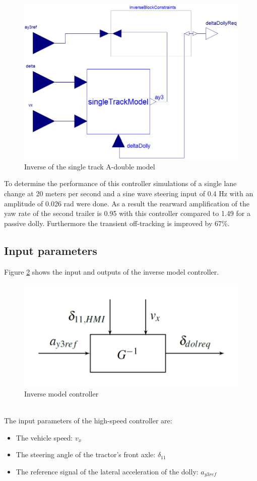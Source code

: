 \documentclass[ExampleMasters.tex]{subfiles}
\begin{document}
\begin{figure}[!htb]
	\centering
	\includegraphics[width=0.5\linewidth]{figures/Inverse_of_A-double_single-track}
	\caption{Inverse of the single track A-double model \cite{High-speed_paper}}
	
	\label{fig:inverse_single_track_model}
\end{figure}

To determine the performance of this controller simulations of a single lane change at 20 meters per second and a sine wave steering input of 0.4 Hz with an amplitude of 0.026 rad were done. As a result the rearward amplification of the yaw rate of the second trailer is 0.95 with this controller compared to 1.49 for a passive dolly. Furthermore the transient off-tracking is improved by 67\%. 

\subsection{Input parameters}
\label{sec:input_parameters_HS}
Figure \ref{fig:inverse_model_controller} shows the input and outputs of the inverse model controller.
\begin{figure}[!htb]
	\centering
	\includegraphics[width=0.5\linewidth]{figures/inverse_controller}
	\caption{Inverse model controller\cite{High-speed_paper}}
	
	\label{fig:inverse_model_controller}
\end{figure}\\
The input parameters of the high-speed controller are:
\begin{itemize}
\item The vehicle speed: $v_x$ 
\item The steering angle of the tractor's front axle: $\delta_{11}$
\item The reference signal of the lateral acceleration of the dolly: $a_{y3ref}$
\end{itemize}
\end{document}
